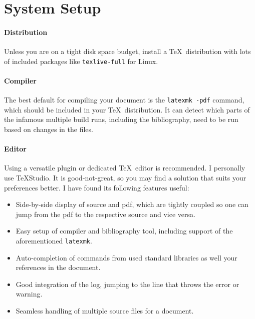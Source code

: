 \section{System Setup}

\paragraph{Distribution} 
Unless you are on a tight disk space budget, install a \TeX\ distribution with lots of included packages like \verb|texlive-full| for Linux.

\paragraph{Compiler} 
The best default for compiling your document is the \verb|latexmk -pdf| command, which should be included in your \TeX\ distribution.
It can detect which parts of the infamous multiple build runs, including the bibliography, need to be run based on changes in the files.

\paragraph{Editor}
Using a versatile plugin or dedicated \TeX\ editor is recommended.
I personally use \TeX Studio.
It is good-not-great, so you may find a solution that suits your preferences better.
I have found its following features useful:
\begin{itemize}
	\item Side-by-side display of source and pdf, which are tightly coupled so one can jump from the pdf to the respective source and vice versa.
	\item Easy setup of compiler and bibliography tool, including support of the aforementioned \verb|latexmk|.
	\item Auto-completion of commands from used standard libraries as well your references in the document.
	\item Good integration of the log, jumping to the line that throws the error or warning.
	\item Seamless handling of multiple source files for a document.
\end{itemize}
